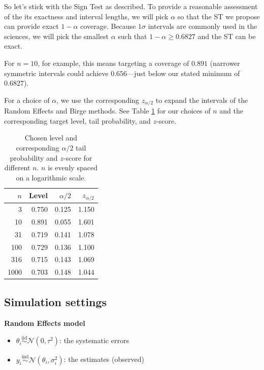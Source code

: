\documentclass[12pt]{article}
\begin{document}
So let's stick with the Sign Test as described. To provide a reasonable assessment of the its exactness and interval lengths, we will pick $\alpha$ so that the ST we propose can provide exact $1-\alpha$ coverage. Because $1\sigma$ intervals are commonly used in the sciences, we will pick the smallest $\alpha$ such that $1-\alpha\geq 0.6827$ and the ST can be exact.

For $n=10$, for example, this means targeting a coverage of $0.891$ (narrower symmetric intervals could achieve $0.656$---just below our stated minimum of $0.6827$).

For a choice of $\alpha$, we use the corresponding $z_{\alpha/2}$ to expand the intervals of the Random Effects and Birge methods. See Table \ref{tab:table-n} for our choices of $n$ and the corresponding target level, tail probability, and $z$-score.

\begin{table}[H]
\centering
\caption{Chosen level and corresponding $\alpha/2$ tail probability and $z$-score for different $n$. $n$ is evenly spaced on a logarithmic scale.}
\label{tab:table-n}
\begin{tabular}{rrrr}
\hline
$n$ & Level & $\alpha/2$ & $z_{\alpha/2}$ \\
\hline
3 & 0.750 & 0.125 & 1.150 \\
10 & 0.891 & 0.055 & 1.601 \\
31 & 0.719 & 0.141 & 1.078 \\
100 & 0.729 & 0.136 & 1.100 \\
316 & 0.715 & 0.143 & 1.069 \\
1000 & 0.703 & 0.148 & 1.044 \\
\hline
\end{tabular}  

\end{table}

\subsection{Simulation settings}\label{simulation-settings}

\textbf{Random Effects model}

\begin{itemize}
\item
  $\theta_i\overset{\mathrm{iid}}{\sim}\mathcal{N}(0,\tau^2)$: the systematic errors
\item
  $y_i\overset{\mathrm{ind}}{\sim}\mathcal{N}(\theta_i,\sigma_i^2)$: the estimates (observed)
\end{itemize}
\end{document}
